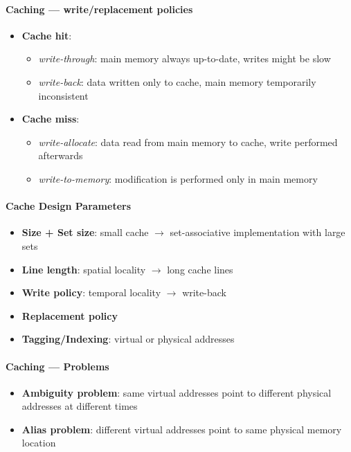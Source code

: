 \paragraph{Caching --- write/replacement policies}
\begin{itemize}
  \item \textbf{Cache hit}:
  \begin{itemize}
    \item \emph{write-through}: main memory always up-to-date, writes might be slow
    \item \emph{write-back}: data written only to cache, main memory temporarily inconsistent
  \end{itemize}
  \item \textbf{Cache miss}:
  \begin{itemize}
    \item \emph{write-allocate}: data read from main memory to cache, write performed afterwards
    \item \emph{write-to-memory}: modification is performed only in main memory
  \end{itemize}
\end{itemize}

\paragraph{Cache Design Parameters}
\begin{itemize}
  \item \textbf{Size + Set size}: small cache $ \to $ set-associative implementation with large sets
  \item \textbf{Line length}: spatial locality $ \to $ long cache lines
  \item \textbf{Write policy}: temporal locality $ \to $ write-back
  \item \textbf{Replacement policy}
  \item \textbf{Tagging/Indexing}: virtual or physical addresses
\end{itemize}

\paragraph{Caching --- Problems}
\begin{itemize}
  \item \textbf{Ambiguity problem}: same virtual addresses point to different physical addresses at different times
  \item \textbf{Alias problem}: different virtual addresses point to same physical memory location
\end{itemize}

